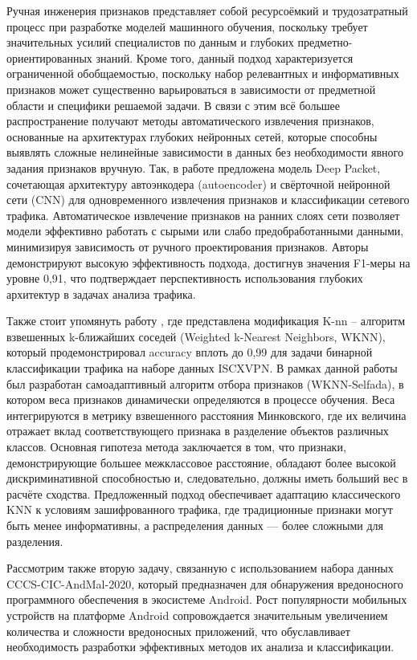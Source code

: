 Ручная инженерия признаков представляет собой ресурсоёмкий и трудозатратный процесс при разработке моделей машинного обучения, поскольку требует значительных усилий специалистов по данным и глубоких предметно-ориентированных знаний. Кроме того, данный подход характеризуется ограниченной обобщаемостью, поскольку набор релевантных и информативных признаков может существенно варьироваться в зависимости от предметной области и специфики решаемой задачи. В связи с этим всё большее распространение получают методы автоматического извлечения признаков, основанные на архитектурах глубоких нейронных сетей, которые способны выявлять сложные нелинейные зависимости в данных без необходимости явного задания признаков вручную. Так, в работе \cite{Haitham2019} предложена модель Deep Packet, сочетающая архитектуру автоэнкодера (autoencoder) и свёрточной нейронной сети (CNN) для одновременного извлечения признаков и классификации сетевого трафика. Автоматическое извлечение признаков на ранних слоях сети позволяет модели эффективно работать с сырыми или слабо предобработанными данными, минимизируя зависимость от ручного проектирования признаков. Авторы демонстрируют высокую эффективность подхода, достигнув значения F1-меры на уровне 0,91, что подтверждает перспективность использования глубоких архитектур в задачах анализа трафика.

Также стоит упомянуть работу \cite{Ma2020}, где представлена модификация K-nn -- алгоритм взвешенных k-ближайших соседей (Weighted k-Nearest Neighbors, WKNN), который продемонстрировал accuracy вплоть до 0,99 для задачи бинарной классификации трафика на наборе данных ISCXVPN. В рамках данной работы был разработан самоадаптивный алгоритм отбора признаков (WKNN-Selfada), в котором веса признаков динамически определяются в процессе обучения. Веса интегрируются в метрику взвешенного расстояния Минковского, где их величина отражает вклад соответствующего признака в разделение объектов различных классов. Основная гипотеза метода заключается в том, что признаки, демонстрирующие большее межклассовое расстояние, обладают более высокой дискриминативной способностью и, следовательно, должны иметь больший вес в расчёте сходства. Предложенный подход обеспечивает адаптацию классического KNN к условиям зашифрованного трафика, где традиционные признаки могут быть менее информативны, а распределения данных — более сложными для разделения.


Рассмотрим также вторую задачу, связанную с использованием набора данных CCCS-CIC-AndMal-2020, который предназначен для обнаружения вредоносного программного обеспечения в экосистеме Android. Рост популярности мобильных устройств на платформе Android сопровождается значительным увеличением количества и сложности вредоносных приложений, что обуславливает необходимость разработки эффективных методов их анализа и классификации.

